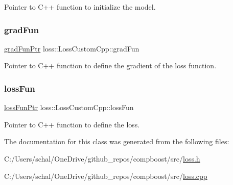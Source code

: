 Pointer to {\ttfamily C++} function to initialize the model. 

\mbox{\label{classloss_1_1_loss_custom_cpp_af5ff497278e6a271c8b26d737c87a219}} 
\subsubsection{\texorpdfstring{grad\+Fun}{gradFun}}
{\footnotesize\ttfamily \mbox{\hyperlink{namespaceloss_acae0785d794ff7cc1b1242bab23f81c6}{grad\+Fun\+Ptr}} loss\+::\+Loss\+Custom\+Cpp\+::grad\+Fun\hspace{0.3cm}{\ttfamily [private]}}



Pointer to {\ttfamily C++} function to define the gradient of the loss function. 

\mbox{\label{classloss_1_1_loss_custom_cpp_ad6f3e81f24f1ea5021d7bc7ab9a67d7a}} 
\subsubsection{\texorpdfstring{loss\+Fun}{lossFun}}
{\footnotesize\ttfamily \mbox{\hyperlink{namespaceloss_a6658cb84c8687d6dd0904c00801542f3}{loss\+Fun\+Ptr}} loss\+::\+Loss\+Custom\+Cpp\+::loss\+Fun\hspace{0.3cm}{\ttfamily [private]}}



Pointer to {\ttfamily C++} function to define the loss. 



The documentation for this class was generated from the following files\+:\begin{DoxyCompactItemize}
\item 
C\+:/\+Users/schal/\+One\+Drive/github\+\_\+repos/compboost/src/\mbox{\hyperlink{loss_8h}{loss.\+h}}\item 
C\+:/\+Users/schal/\+One\+Drive/github\+\_\+repos/compboost/src/\mbox{\hyperlink{loss_8cpp}{loss.\+cpp}}\end{DoxyCompactItemize}
